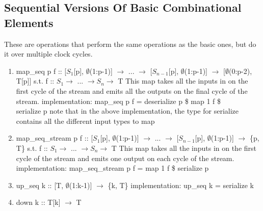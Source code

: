 \documentclass[11pt,fleqn]{article}
\numberwithin{equation}{subsection}
\begin{document}
\subsection{Sequential Versions Of Basic Combinational Elements}
These are operations that perform the same operations as the basic ones, but
do it over multiple clock cycles.
\begin{enumerate}
    \item map\_seq p f :: [$S_1$[p], $\emptyset$(1:p-1)] $\rightarrow$ ...
        $\rightarrow$ [$S_{n-1}$[p], $\emptyset$(1:p-1)] $\rightarrow$
        [$\emptyset$(0:p-2), T[p]]
        \subitem s.t. f :: $S_1 \rightarrow$ ... $\rightarrow S_n \rightarrow$ T
        \subitem This map takes all the inputs in on the first cycle of the 
        stream and emits all the outputs on the final cycle of the stream.
        \subitem implementation: map\_seq p f = deserialize p \$ map 1 f \$ \\ serialize p
        \subitem note that in the above implementation, the type for serialize 
        contains all the different input types to map
    \item map\_seq\_stream p f :: [$S_1$[p], $\emptyset$(1:p-1)] $\rightarrow$ ...
        $\rightarrow$ [$S_{n-1}$[p], $\emptyset$(1:p-1)] $\rightarrow$
        \{p, T\}
        \subitem s.t. f :: $S_1 \rightarrow$ ... $\rightarrow S_n \rightarrow$ T
        \subitem This map takes all the inputs in on the first cycle of the 
        stream and emits one output on each cycle of the stream.
        \subitem implementation: map\_seq\_stream p f = map 1 f \$ serialize p
    \item up\_seq k :: [T, $\emptyset$(1:k-1)] $\rightarrow$ \{k, T\}
        \subitem implementation: up\_seq k = serialize k
    \item down k :: T[k] $\rightarrow$ T
\end{enumerate}
\end{document}
